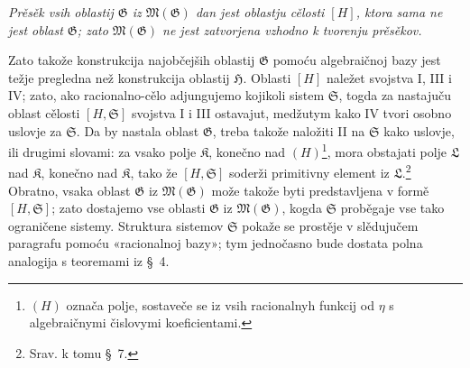 \documentclass[11pt]{article}
\begin{document}
{\itshape Prěsěk vsih oblastij $\mathfrak G$ iz $\mathfrak M(\mathfrak G)$ dan
jest oblastju cělosti $[H]$, ktora sama ne jest oblast $\mathfrak G$; zato
$\mathfrak M(\mathfrak G)$ ne jest zatvorjena vzhodno k tvorenju prěsěkov.}

Zato takože konstrukcija najobčejših oblastij $\mathfrak G$ pomoću algebraičnoj
bazy jest težje pregledna než konstrukcija oblastij $\mathfrak H$. Oblasti $[H]$
naležet svojstva I, III i IV; zato, ako racionalno-cělo adjungujemo kojikoli
sistem $\mathfrak S$, togda za nastajuču oblast cělosti $[H,\mathfrak S]$
svojstva I i III ostavajut, medžutym kako IV tvori osobno uslovje za
$\mathfrak S$. Da by nastala oblast $\mathfrak G$, treba takože naložiti II na
$\mathfrak S$ kako uslovje, ili drugimi slovami: za vsako polje $\mathfrak K$,
konečno nad $(H)$\footnote{$(H)$ označa polje, sostaveče se iz vsih racionalnyh
funkcij od $\eta$ s algebraičnymi čislovymi koeficientami.}, mora obstajati
polje $\mathfrak L$ nad $\mathfrak K$, konečno nad $\mathfrak K$, tako že
$[H,\mathfrak S]$ soderži primitivny element iz $\mathfrak L$.\footnote{Srav. k
tomu \S\ 7.} Obratno, vsaka oblast $\mathfrak G$ iz
$\mathfrak M(\mathfrak G)$ može takože byti predstavljena v formě
$[H,\mathfrak S]$; zato dostajemo vse oblasti $\mathfrak G$ iz
$\mathfrak M(\mathfrak G)$, kogda $\mathfrak S$ proběgaje vse tako ograničene
sistemy. Struktura sistemov $\mathfrak S$ pokaže se prostěje v slědujučem
paragrafu pomoću «racionalnoj bazy»; tym jednočasno bude dostata polna analogija
s teoremami iz \S\ 4.
\end{document}
